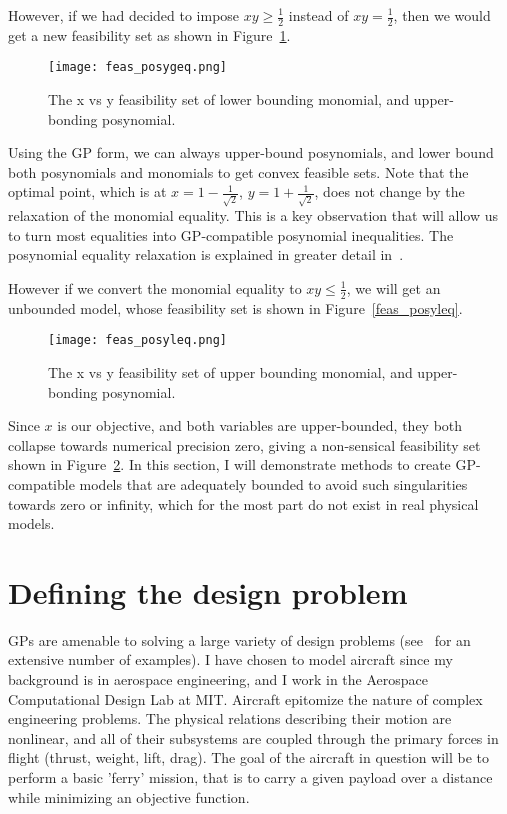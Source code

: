 However, if we had decided to impose $xy \geq \frac{1}{2}$ instead of $xy = \frac{1}{2}$,
then we would get a new feasibility set as shown in Figure~\ref{f:feas_posygeq}.

\begin{figure}
    \centering
    \texttt{[image: feas\_posygeq.png]}
    \caption{The x vs y feasibility set of lower bounding monomial,
    and upper-bonding posynomial.}
    \label{f:feas_posygeq}
\end{figure}

Using the \gls{GP} form, we can always upper-bound posynomials, and lower bound both posynomials
and monomials to get convex feasible sets. Note that the optimal point, which is at
$x = 1 - \frac{1}{\sqrt{2}}$, $y = 1 + \frac{1}{\sqrt{2}}$,
does not change by the relaxation of the monomial equality. This is a key
observation that will allow us to turn most equalities into \gls{GP}-compatible
posynomial inequalities. The posynomial equality relaxation is explained in greater detail
in~\cite{hoburg_thesis}.

However if we convert the monomial equality to  $xy \leq \frac{1}{2}$, we will get an unbounded model,
whose feasibility set is shown in Figure~\ref{feas_posyleq}.

\begin{figure}
    \centering
    \texttt{[image: feas\_posyleq.png]}
    \caption{The x vs y feasibility set of upper bounding monomial,
    and upper-bonding posynomial.}
    \label{f:feas_posyleq}
\end{figure}

Since $x$ is our objective, and both variables are upper-bounded, they both collapse towards numerical
precision zero,
giving a non-sensical feasibility set shown in Figure~\ref{f:feas_posyleq}. In this section, I will
demonstrate methods to create \gls{GP}-compatible models that are adequately bounded to avoid such
singularities towards zero or infinity, which for the most part do not
exist in real physical models.

\section{Defining the design problem}

\gls{GP}s are amenable to solving a large variety of design problems (see~\cite{gpintro} for an
extensive number of examples). I have chosen to model aircraft since my background is in
aerospace engineering,
and I work in the Aerospace Computational Design Lab at MIT.
Aircraft epitomize the nature of complex engineering problems. The physical 
relations describing their motion are nonlinear, and all of their subsystems are 
coupled through the primary forces in flight (thrust, weight, lift, drag).
The goal of the aircraft in question will be to perform a basic 'ferry' mission, that
is to carry a given payload
over a distance while minimizing an objective function.

